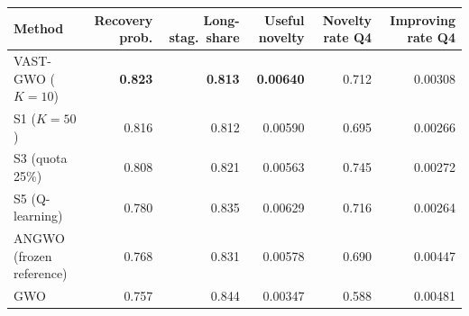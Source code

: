 \begin{tabular}{lrrrrr}
\toprule
Method & Recovery prob. & Long-stag.\ share & Useful novelty & Novelty rate Q4 & Improving rate Q4 \\
\midrule
VAST-GWO ($K=10$) & \textbf{0.823} & \textbf{0.813} & \textbf{0.00640} & 0.712 & 0.00308 \\
S1 ($K=50$) & 0.816 & 0.812 & 0.00590 & 0.695 & 0.00266 \\
S3 (quota 25\%) & 0.808 & 0.821 & 0.00563 & 0.745 & 0.00272 \\
S5 (Q-learning) & 0.780 & 0.835 & 0.00629 & 0.716 & 0.00264 \\
ANGWO (frozen reference) & 0.768 & 0.831 & 0.00578 & 0.690 & 0.00447 \\
GWO & 0.757 & 0.844 & 0.00347 & 0.588 & 0.00481 \\
\bottomrule
\end{tabular}
